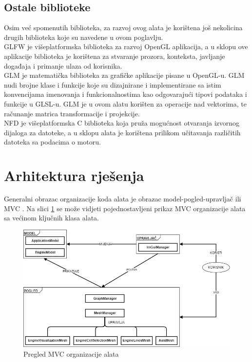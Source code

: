 \documentclass[times, utf8, diplomski]{fer}
\begin{document}
\subsection{Ostale biblioteke}
Osim već spomenutih biblioteka, za razvoj ovog alata je korištena još nekolicina drugih biblioteka koje su navedene u ovom poglavlju.\\

GLFW\citep{glfw} je višeplatformska biblioteka za razvoj OpenGL aplikacija, a u sklopu ove aplikacije biblioteka je korištena za stvaranje prozora, konteksta, javljanje događaja i primanje ulaza od korisnika.\\

GLM\citep{glm} je matematička biblioteka za grafičke aplikacije pisane u OpenGL-u. GLM nudi brojne klase i funkcije koje su dizajnirane i implementirane sa istim konvencijama imenovanja i funkcionalnostima kao odgovarajući tipovi podataka i funkcije u GLSL-u. GLM je u ovom alatu korišten za operacije nad vektorima, te računanje matrica transformacije i projekcije.\\

NFD\citep{nfd}  je višeplatformska C biblioteka koja pruža mogućnost otvaranja izvornog dijaloga za datoteke, a u sklopu alata je korištena prilikom učitavanja različitih datoteka sa podacima o motoru.

\section{Arhitektura rješenja} \label{codebase-architecture-section}

Generalni obrazac organizacije koda alata je obrazac model-pogled-upravljač ili MVC . Na slici \ref{fig:high-level-overview} se može vidjeti pojednostavljeni prikaz MVC organizacije alata sa većinom ključnih klasa alata.

\begin{figure} [H]
	\centering
    \includegraphics[width=\textwidth]{high_level_overview.png}
    \caption{Pregled MVC organizacije alata}
    \label{fig:high-level-overview}
\end{figure}
\ 
\\
\end{document}
